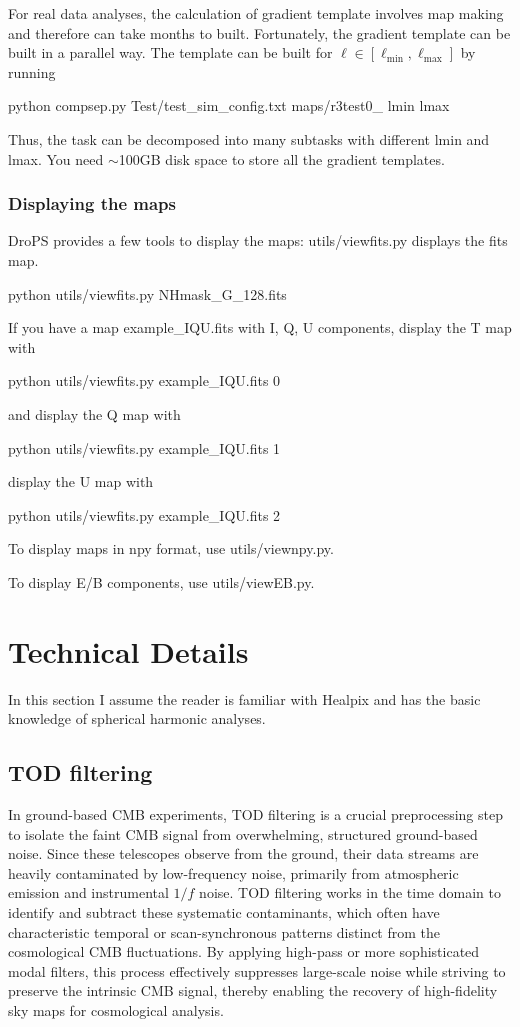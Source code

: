 \documentclass[12pt, a4paper]{ctexart} %
\def\tbox#1{\begin{tcolorbox}#1\end{tcolorbox}}
\begin{document}
For real data analyses, the calculation of gradient template involves map making and therefore can take months to built. Fortunately, the gradient template can be built in a parallel way. The template can be built for $\ell \in [\ell_{\min}, \ell_{\max}]$ by running
\tbox{python compsep.py Test/test\_sim\_config.txt maps/r3test0\_ lmin lmax}
Thus, the task can be decomposed into many subtasks with different lmin and lmax. You need $\sim$100GB disk space to store all the gradient templates.



\subsubsection{Displaying the maps}

DroPS provides a few tools to display the maps: utils/viewfits.py displays the fits map.

\tbox{python utils/viewfits.py NHmask\_G\_128.fits}

If you have a map example\_IQU.fits with I, Q, U components, display the T map with
\tbox{python utils/viewfits.py example\_IQU.fits 0}
and display the Q map with
\tbox{python utils/viewfits.py example\_IQU.fits 1}
display the U map with
\tbox{python utils/viewfits.py example\_IQU.fits 2}


To display maps in npy format, use utils/viewnpy.py.

To display E/B components, use utils/viewEB.py.

\section{Technical Details}

In this section I assume the reader is familiar with Healpix and has the basic knowledge of spherical harmonic analyses.

\subsection{TOD filtering}

In ground-based CMB experiments, TOD filtering is a crucial preprocessing step to isolate the faint CMB signal from overwhelming, structured ground-based noise. Since these telescopes observe from the ground, their data streams are heavily contaminated by low-frequency noise, primarily from atmospheric emission and instrumental $1/f$ noise. TOD filtering works in the time domain to identify and subtract these systematic contaminants, which often have characteristic temporal or scan-synchronous patterns distinct from the cosmological CMB fluctuations. By applying high-pass or more sophisticated modal filters, this process effectively suppresses large-scale noise while striving to preserve the intrinsic CMB signal, thereby enabling the recovery of high-fidelity sky maps for cosmological analysis.
\end{document}
